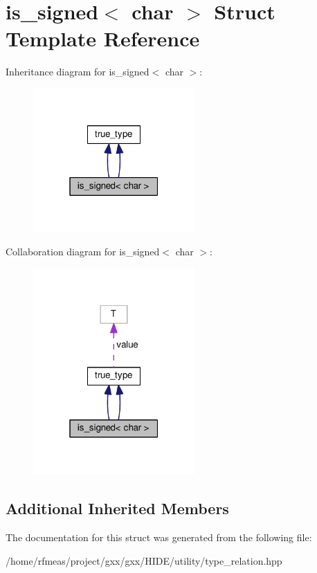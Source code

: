 \hypertarget{structis__signed_3_01char_01_4}{}\section{is\+\_\+signed$<$ char $>$ Struct Template Reference}
\label{structis__signed_3_01char_01_4}


Inheritance diagram for is\+\_\+signed$<$ char $>$\+:
\nopagebreak
\begin{figure}[H]
\begin{center}
\leavevmode
\includegraphics[width=175pt]{structis__signed_3_01char_01_4__inherit__graph}
\end{center}
\end{figure}


Collaboration diagram for is\+\_\+signed$<$ char $>$\+:
\nopagebreak
\begin{figure}[H]
\begin{center}
\leavevmode
\includegraphics[width=175pt]{structis__signed_3_01char_01_4__coll__graph}
\end{center}
\end{figure}
\subsection*{Additional Inherited Members}


The documentation for this struct was generated from the following file\+:\begin{DoxyCompactItemize}
\item 
/home/rfmeas/project/gxx/gxx/\+H\+I\+D\+E/utility/type\+\_\+relation.\+hpp\end{DoxyCompactItemize}
